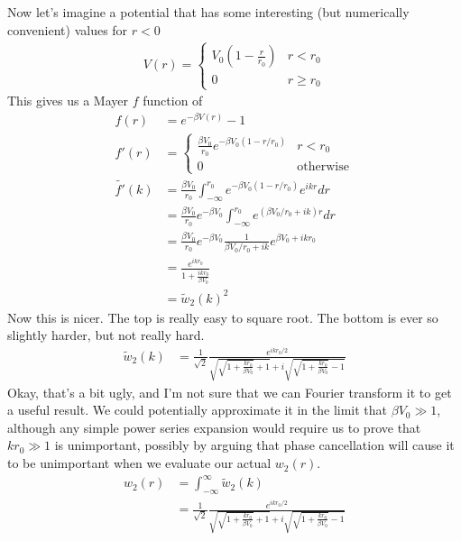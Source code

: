 \documentclass[letterpaper,twocolumn,amsmath,amssymb,prb]{revtex4-1}
\begin{document}
Now let's imagine a potential that has some interesting (but
numerically convenient) values for $r<0$
\begin{align}
  V(r) =
  \begin{cases}
    V_0\left(1 - \frac{r}{r_0}\right) & r < r_0 \\
    0 & r \ge r_0
  \end{cases}
\end{align}
This gives us a Mayer $f$ function of
\begin{align}
  f(r) &= e^{-\beta V(r)} - 1 \label{eq:ftrytwo} \\
  f'(r) &=
  \begin{cases}
    \frac{\beta V_0}{r_0} e^{-\beta V_0(1-r/r_0)} & r < r_0 \\
    0 & \text{otherwise}
  \end{cases} \\
  \tilde{f'}(k) &= \frac{\beta V_0}{r_0}\int_{-\infty}^{r_0} e^{-\beta
    V_0(1-r/r_0)}e^{ikr}dr \\
  &= \frac{\beta V_0}{r_0}e^{-\beta V_0}
  \int_{-\infty}^{r_0} e^{(\beta V_0/r_0 + ik)r} dr
  \\
  &= \frac{\beta V_0}{r_0}e^{-\beta V_0} \frac{1}{\beta V_0/r_0 + ik}e^{\beta V_0+ikr_0}
  \\
  &= \frac{e^{ikr_0}}{1 + \frac{ikr_0}{\beta V_0}}
  \\
  &= \tilde{w}_2(k)^2
\end{align}
Now this is nicer.  The top is really easy to square root.  The bottom
is ever so slightly harder, but not really hard.
\begin{align}
  \tilde{w}_2(k) &=
  \frac1{\sqrt{2}}\frac{e^{ikr_0/2}}{\sqrt{\sqrt{1+\frac{kr_0}{\beta
          V_0}}+1} +
      i\sqrt{\sqrt{1+\frac{kr_0}{\beta V_0}}-1}}
\end{align}
Okay, that's a bit ugly, and I'm not sure that we can Fourier
transform it to get a useful result.  We could potentially approximate
it in the limit that $\beta V_0 \gg 1$, although any simple power
series expansion would require us to prove that $kr_0\gg1$ is
unimportant, possibly by arguing that phase cancellation will cause it
to be unimportant when we evaluate our actual $w_2(r)$.
\begin{align}
  w_2(r) &= \int_{-\infty}^\infty \tilde{w}_2(k) \\
 &=
  \frac1{\sqrt{2}}\frac{e^{ikr_0/2}}{\sqrt{\sqrt{1+\frac{kr_0}{\beta
          V_0}}+1} +
      i\sqrt{\sqrt{1+\frac{kr_0}{\beta V_0}}-1}}
\end{align}
\end{document}
